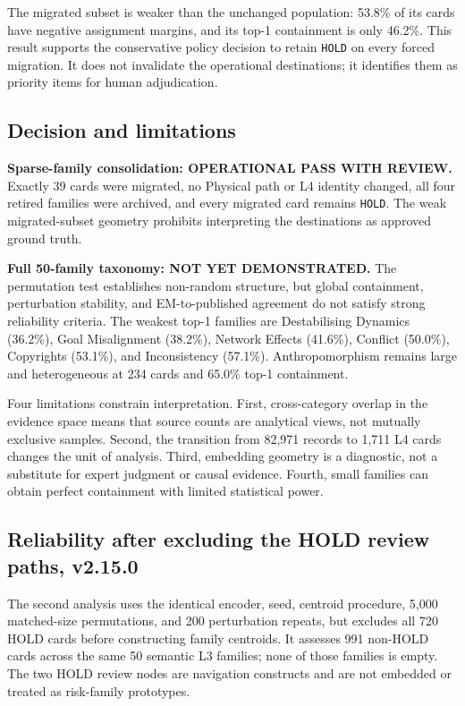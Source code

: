 \documentclass[11pt,a4paper]{article}
\newcommand{\code}[1]{\texttt{#1}}
\begin{document}
The migrated subset is weaker than the unchanged population: 53.8\% of its
cards have negative assignment margins, and its top-1 containment is only
46.2\%. This result supports the conservative policy decision to retain
\code{HOLD} on every forced migration. It does not invalidate the operational
destinations; it identifies them as priority items for human adjudication.

\subsection{Decision and limitations}

\textbf{Sparse-family consolidation: OPERATIONAL PASS WITH REVIEW.} Exactly 39
cards were migrated, no Physical path or L4 identity changed, all four retired
families were archived, and every migrated card remains \code{HOLD}. The weak
migrated-subset geometry prohibits interpreting the destinations as approved
ground truth.

\textbf{Full 50-family taxonomy: NOT YET DEMONSTRATED.} The permutation test
establishes non-random structure, but global containment, perturbation
stability, and EM-to-published agreement do not satisfy strong reliability
criteria. The weakest top-1 families are Destabilising Dynamics (36.2\%), Goal
Misalignment (38.2\%), Network Effects (41.6\%), Conflict (50.0\%), Copyrights
(53.1\%), and Inconsistency (57.1\%). Anthropomorphism remains large and
heterogeneous at 234 cards and 65.0\% top-1 containment.

Four limitations constrain interpretation. First, cross-category overlap in
the evidence space means that source counts are analytical views, not mutually
exclusive samples. Second, the transition from 82,971 records to 1,711 L4
cards changes the unit of analysis. Third, embedding geometry is a diagnostic,
not a substitute for expert judgment or causal evidence. Fourth, small
families can obtain perfect containment with limited statistical power.

\subsection{Reliability after excluding the HOLD review paths, v2.15.0}

The second analysis uses the identical encoder, seed, centroid procedure,
5,000 matched-size permutations, and 200 perturbation repeats, but excludes
all 720 HOLD cards before constructing family centroids. It assesses 991
non-HOLD cards across the same 50 semantic L3 families; none of those families
is empty. The two HOLD review nodes are navigation constructs and are not
embedded or treated as risk-family prototypes.
\end{document}
